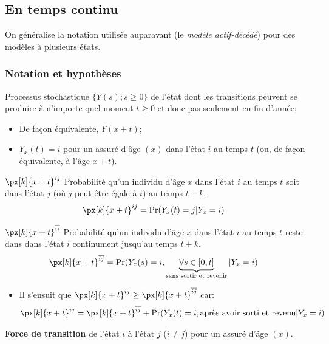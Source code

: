 \documentclass[10pt, french]{article}
\begin{document}
\begin{multicols*}{2}
\subsection{En temps continu}
On généralise la notation utilisée auparavant (le \textit{modèle actif-décédé}) pour des modèles à plusieurs états.

\subsubsection*{Notation et hypothèses}
\begin{description}
	\item[$Y_{x}(t)$]	Processus stochastique $\{Y(s); s \ge 0\}$ de l'état dont les transitions peuvent se produire à n'importe quel moment $t \ge 0$ et donc pas seulement en fin d'année;
		\begin{itemize}[leftmargin = *]
		\item	De façon équivalente, $Y(x + t)$;
		\item	$Y_{x}(t) = i$ pour un assuré d'âge $(x)$ dans l'état $i$ au temps $t$ (ou, de façon équivalente, à l'âge $x + t$).
		\end{itemize}
	\item	$\px[k]{x + t}^{ij}$	Probabilité qu'un individu d'âge $x$ dans l'état $i$ au temps $t$ soit dans l'état $j$ (où $j$ peut être égale à $i$) au temps $t + k$.
		\begin{align*}
		\px[k]{x + t}^{ij}
		&=	\Pr(Y_{x}(t) = j | Y_{x} = i)
		\end{align*}
	\item	$\px[k]{x + t}^{\overline{ii}}$	Probabilité qu'un individu d'âge $x$ dans l'état $i$ au temps $t$ reste dans dans l'état $i$ continument jusqu'au temps $t + k$.
		\begin{align*}
		\px[k]{x + t}^{\overline{ij}}
		&=	\Pr(Y_{x}(s) = i, \underbrace{\forall s \in [0, t]}_{\text{sans sortir et revenir}} | Y_{x} = i)
		\end{align*}
		\begin{itemize}[leftmargin = *]
			\item	Il s'ensuit que $\px[k]{x + t}^{ij} \geq \px[k]{x + t}^{\overline{ij}}$ car:
				\begin{align*}
				\px[k]{x + t}^{ij}
				&=	\px[k]{x + t}^{\overline{ij}} + \Pr(Y_{x}(t) = i, \text{après avoir sorti et revenu} | Y_{x} = i)	\\
				\end{align*}
		\end{itemize}
	\item[$\mu_{x}^{ij}$]	\textbf{Force de transition} de l'état $i$ à l'état $j$ (\underline{$i \neq j$}) pour un assuré d'âge $(x)$.

\end{description}
\end{multicols*}
\end{document}
